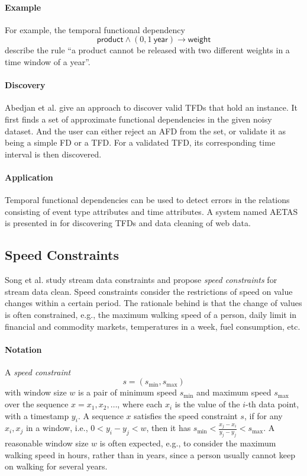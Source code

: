 \documentclass{article}
\begin{document}
\paragraph{Example}
For example, the temporal functional dependency
$$\mathsf{product} \wedge (0, 1 ~ \mathsf{year}) \rightarrow \mathsf{weight}$$
describe the rule ``a product cannot be released with two different weights in a time window of a year''.

\paragraph{Discovery}
Abedjan et al. \cite{DBLP:journals/pvldb/AbedjanAOPS15} give an approach to discover valid TFDs that hold an instance.
It first finds a set of approximate functional dependencies in the given noisy dataset.
And the user can either reject an AFD from the set,
or validate it as being a simple FD or a TFD.
For a validated TFD, its corresponding time interval is then discovered.

\paragraph{Application}
Temporal functional dependencies can be used to detect errors in the relations consisting of event type attributes and time attributes.
A system named AETAS is presented in \cite{DBLP:journals/pvldb/AbedjanAOPS15} for discovering TFDs and data cleaning of web data.


\subsection{Speed Constraints}
\label{sect-Speed-Constraint}

Song et al. \cite{DBLP:conf/sigmod/SongZWY15} study stream data constraints and propose \emph{speed constraints} for stream data clean.
Speed constraints consider the restrictions of speed on value changes within a certain period.
The rationale behind is that the change of values is often constrained, e.g., 
the maximum walking speed of a person,
daily limit in financial and commodity markets,
temperatures in a week,
fuel consumption, 
etc.

\paragraph{Notation}
A \emph{speed constraint}
$$\mathit{s} = (\mathit{s}_{\min}, \mathit{s}_{\max})$$
with window size $\mathit{w}$ is a pair of minimum speed $\mathit{s}_{\min}$ and maximum speed $\mathit{s}_{\max}$
over the sequence $\mathit{x} = \mathit{x}_1, \mathit{x}_2, \dots$, where each $\mathit{x}_i$ is the value of the $i$-th data point, with a timestamp $\mathit{y}_i$.
A sequence $\mathit{x}$ satisfies the speed constraint $\mathit{s}$,
if for any $\mathit{x}_i, \mathit{x}_j$ in a window, i.e., $0 < \mathit{y}_i - \mathit{y}_j < \mathit{w}$,
then it has $\mathit{s}_{\min} < \frac{\mathit{x}_j - \mathit{x}_i}{\mathit{y}_j - \mathit{y}_j} < \mathit{s}_{\max}$.
A reasonable window size $\mathit{w}$ is often expected, e.g., to consider the maximum walking speed in hours, rather than in years,
since a person usually cannot keep on walking for several years. 
\end{document}
